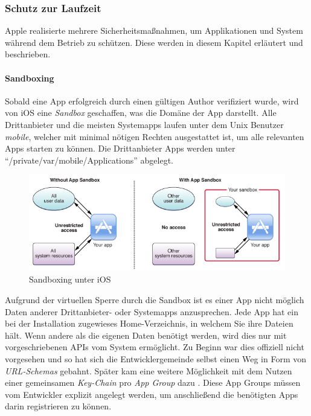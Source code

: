 	\subsubsection{Schutz zur Laufzeit}
		Apple realisierte mehrere Sicherheitsmaßnahmen, um Applikationen und System
		während dem Betrieb zu schützen. Diese werden in diesem Kapitel erläutert und
		beschrieben.
		
		\paragraph{Sandboxing}\label{sec:sandboxing}
			Sobald eine App erfolgreich durch einen gültigen Author verifiziert wurde,
			wird von iOS eine \textsl{Sandbox} geschaffen, was die Domäne der App
			darstellt. Alle Drittanbieter und die meisten Systemapps laufen unter dem
			Unix Benutzer \textsl{mobile}, welcher mit minimal nötigen Rechten
			ausgestattet ist, um alle relevanten Apps starten zu können. Die
			Drittanbieter Apps werden unter "`/private/var/mobile/Applications"'
			abgelegt.
			\begin{figure}[h]
				\centering
				\includegraphics[width=0.9\linewidth]{ios/media/sandboxing.png}
				\caption{Sandboxing unter iOS 
				\cite{IOSSandboxing}}
				\label{fig:sandboxing}
			\end{figure}
			Aufgrund der virtuellen Sperre durch die Sandbox ist es einer App nicht
			möglich Daten anderer Drittanbieter- oder Systemapps anzusprechen. Jede App
			hat ein bei der Installation zugewieses Home-Verzeichnis, in
			welchem Sie ihre Dateien hält. Wenn andere als die eigenen Daten benötigt
			werden, wird dies nur mit vorgeschriebenen APIs vom System ermöglicht. Zu
			Beginn war dies offiziell nicht vorgesehen und so hat sich die
			Entwicklergemeinde selbst einen Weg in Form von \textsl{URL-Schemas}
			gebahnt. Später kam eine weitere Möglichkeit mit dem Nutzen einer
			gemeinsamen \textsl{Key-Chain} pro \textsl{App Group}
			dazu \cite[S.83]{Banks2015}. Diese App Groups müssen vom Entwickler explizit
			angelegt werden, um anschließend die benötigten Apps darin registrieren zu
			können.
				
